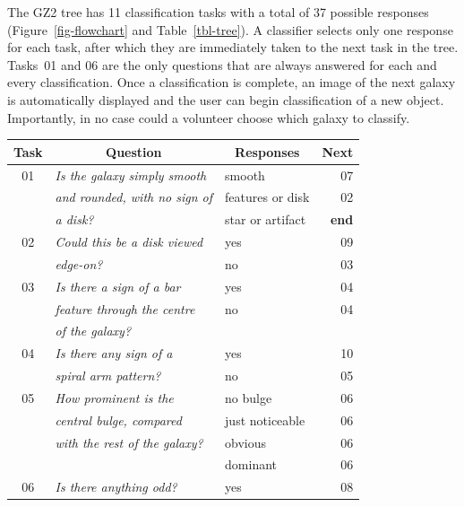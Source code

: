 \documentclass[useAMS,usenatbib]{mn2e}
\begin{document}
The GZ2 tree has 11 classification tasks with a total of 37 possible responses (Figure~\ref{fig-flowchart} and Table~\ref{tbl-tree}). A classifier selects only one response for each task, after which they are immediately taken to the next task in the tree. Tasks~01 and 06 are the only questions that are always answered for each and every classification. Once a classification is complete, an image of the next galaxy is automatically displayed and the user can begin classification of a new object. Importantly, in no case could a volunteer choose which galaxy to classify. 

\begin{table}
 \begin{tabular}{@{}cllr}
 \hline
\multicolumn{1}{l}{Task} &
\multicolumn{1}{c}{Question} &
\multicolumn{1}{c}{Responses} &
\multicolumn{1}{c}{Next} 
\\ 
\hline
\hline						
01    & {\it Is the galaxy simply smooth   }  & smooth           & 07 \\
      & {\it and rounded, with no sign of  }  & features or disk & 02 \\
      & {\it a disk?                       }  & star or artifact & {\bf end} \\
      \hline
02    & {\it Could this be a disk viewed   }  & yes              & 09 \\
      & {\it edge-on?                      }  & no               & 03 \\
      \hline
03    & {\it Is there a sign of a bar      }  & yes              & 04 \\
      & {\it feature through the centre    }  & no               & 04 \\
      & {\it of the galaxy?                }                                        \\
      \hline
04    & {\it Is there any sign of a        }  & yes              & 10 \\
      & {\it spiral arm pattern?           }  & no               & 05 \\
      \hline
05    & {\it How prominent is the          }  & no bulge         & 06 \\
      & {\it central bulge, compared       }  & just noticeable  & 06 \\
      & {\it with the rest of the galaxy?  }  & obvious          & 06 \\
      & {\it                               }  & dominant         & 06 \\
      \hline
06    & {\it Is there anything odd?        }  & yes              & 08 \\ 

\end{tabular}
\end{table}
\end{document}
